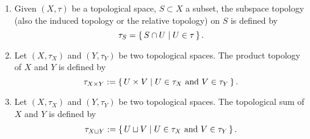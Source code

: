 \begin{defbox}
    \begin{definition}
        \begin{enumerate}
            \item Given \((X, \tau)\) be a {\color{mathif}topological space}, \(S \subset X\) a subset, the {\color{maththen}subspace topology} (also the induced topology or the relative topology) on \(S\) is defined by
            \begin{equation*}
                \tau_S = \left\{\, S \cap U \mid U \in \tau \,\right\} \text{.}
            \end{equation*}
            \item Let \((X, \tau_X)\) and \((Y, \tau_Y)\) be two {\color{mathif}topological spaces}. The product topology of \(X\) and \(Y\) is defined by
            \begin{equation*}
                \tau_{X \times Y} := \left\{\, U \times V \mid U \in \tau_X \text{ and } V \in \tau_Y \,\right\} \text{.}
            \end{equation*}
            \item Let \((X, \tau_X)\) and \((Y, \tau_Y)\) be two {\color{mathif}topological spaces}. The topological sum of \(X\) and \(Y\) is defined by
            \begin{align*}
                \tau_{X \sqcup Y} := \left\{\, U \sqcup V \mid U \in \tau_X \text{ and } V \in \tau_Y \,\right\} \text{.}
            \end{align*}
        \end{enumerate}
    \end{definition}
\end{defbox}

